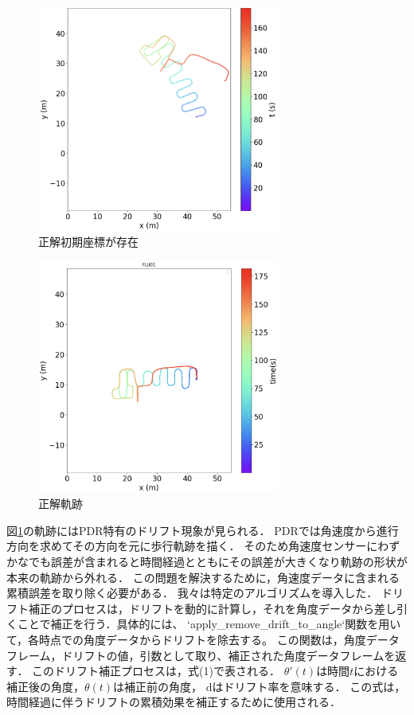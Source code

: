 \documentclass[Japanese]{dicomopapers}
\begin{document}
\begin{figure}[h]
	\centering
	\includegraphics[width=80mm]{image/pdr-move.jpg}
	\caption{正解初期座標が存在}    \label{fig:pdr-move}
\end{figure}

\begin{figure}[h]
	\centering
	\includegraphics[width=80mm]{image/gt2.jpg}
	\caption{正解軌跡}    \label{fig:gt-trajectory}
\end{figure}


図\ref{fig:pdr-move}の軌跡にはPDR特有のドリフト現象が見られる．
PDRでは角速度から進行方向を求めてその方向を元に歩行軌跡を描く．
そのため角速度センサーにわずかなでも誤差が含まれると時間経過とともにその誤差が大きくなり軌跡の形状が本来の軌跡から外れる．
この問題を解決するために，角速度データに含まれる累積誤差を取り除く必要がある．
我々は特定のアルゴリズムを導入した．
ドリフト補正のプロセスは，ドリフトを動的に計算し，それを角度データから差し引くことで補正を行う．具体的には、
`apply\_remove\_drift\_to\_angle`関数を用いて，各時点での角度データからドリフトを除去する。
この関数は，角度データフレーム，ドリフトの値，引数として取り、補正された角度データフレームを返す．
このドリフト補正プロセスは，式(1)で表される．
$\theta'(t)$は時間$t$における補正後の角度，$\theta(t)$は補正前の角度，
$\mathrm{d}$はドリフト率を意味する．
この式は，時間経過に伴うドリフトの累積効果を補正するために使用される．
\end{document}
